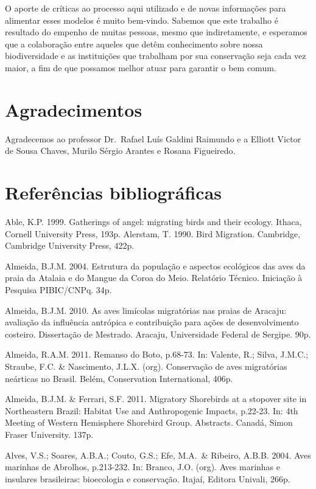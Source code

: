 \documentclass[
]{scrbook}
\begin{document}
O aporte de críticas ao processo aqui utilizado e de novas informações para alimentar esses modelos é muito bem-vindo. Sabemos que este trabalho é resultado do empenho de muitas pessoas, mesmo que indiretamente, e esperamos que a colaboração entre aqueles que detêm conhecimento sobre nossa biodiversidade e as instituições que trabalham por sua conservação seja cada vez maior, a fim de que possamos melhor atuar para garantir o bem comum.

\hypertarget{agradecimentos}{%
\section{Agradecimentos}\label{agradecimentos}}

Agradecemos ao professor Dr.~Rafael Luís Galdini Raimundo e a Elliott Victor de Sousa Chaves, Murilo Sérgio Arantes e Rosana Figueiredo.

\hypertarget{referencias}{%
\section{Referências bibliográficas}\label{referencias}}

Able, K.P. 1999. Gatherings of angel: migrating birds and their ecology. Ithaca, Cornell University Press, 193p.
Alerstam, T. 1990. Bird Migration. Cambridge, Cambridge University Press, 422p.

Almeida, B.J.M. 2004. Estrutura da população e aspectos ecológicos das aves da praia da Atalaia e do Mangue da Coroa do Meio. Relatório Técnico. Iniciação à Pesquisa PIBIC/CNPq. 34p.

Almeida, B.J.M. 2010. As aves limícolas migratórias nas praias de Aracaju: avaliação da influência antrópica e contribuição para ações de desenvolvimento costeiro. Dissertação de Mestrado. Aracaju, Universidade Federal de Sergipe. 90p.

Almeida, R.A.M. 2011. Remanso do Boto, p.68-73. In: Valente, R.; Silva, J.M.C.; Straube, F.C. \& Nascimento, J.L.X. (org). Conservação de aves migratórias neárticas no Brasil. Belém, Conservation International, 406p.

Almeida, B.J.M. \& Ferrari, S.F. 2011. Migratory Shorebirds at a stopover site in Northeastern Brazil: Habitat Use and Anthropogenic Impacts, p.22-23. In: 4th Meeting of Western Hemisphere Shorebird Group. Abstracts. Canadá, Simon Fraser University. 137p.

Alves, V.S.; Soares, A.B.A.; Couto, G.S.; Efe, M.A.~\& Ribeiro, A.B.B. 2004. Aves marinhas de Abrolhos, p.213-232. In: Branco, J.O. (org). Aves marinhas e insulares brasileiras: bioecologia e conservação. Itajaí, Editora Univali, 266p.
\end{document}
